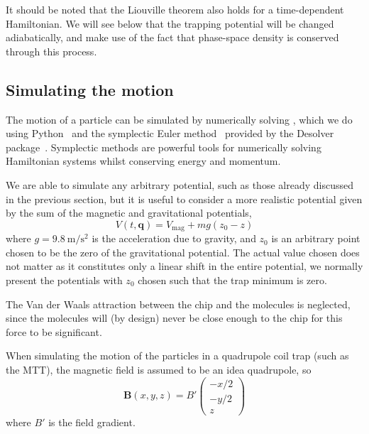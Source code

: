 It should be noted that the Liouville theorem also holds for a time-dependent
Hamiltonian. We will see below that the trapping potential will be changed
adiabatically, and make use of the fact that phase-space density is conserved
through this process.

\subsection{Simulating the motion}
\label{design:motion:simmethods}

The motion of a particle can be simulated by numerically solving
, which we do using Python~\cite{python} and the
symplectic Euler method~\cite{Hairer2015, doi:10.1119/1.2034523} provided by
the Desolver package~\cite{desolver}. Symplectic methods are powerful tools
for numerically solving Hamiltonian systems whilst conserving energy and
momentum.

We are able to simulate any arbitrary potential, such as those already
discussed in the previous section, but it is useful to consider a more
realistic potential given by the sum of the magnetic and gravitational
potentials,
%
\begin{equation}
  V(t, \mathbf{q}) = V_\text{mag} + mg(z_0-z)
\end{equation}
where $g=\SI{9.8}{\meter\per\second\squared}$ is the acceleration due to
gravity, and $z_0$ is an arbitrary point chosen to be the zero of the
gravitational potential. The actual value chosen does not matter as it
constitutes only a linear shift in the entire potential, we normally present
the potentials with $z_0$ chosen such that the trap minimum is zero.

The Van der Waals attraction between the chip and the molecules is neglected,
since the molecules will (by design) never be close enough to the chip for this
force to be significant.

When simulating the motion of the particles in a quadrupole coil trap (such as
the MTT), the magnetic field is assumed to be an idea quadrupole, so
%
\begin{equation}
  \mathbf{B}(x, y, z) = B'\begin{pmatrix} -x/2 \\ -y/2 \\ z \end{pmatrix}
\end{equation}
where $B'$ is the field gradient.

